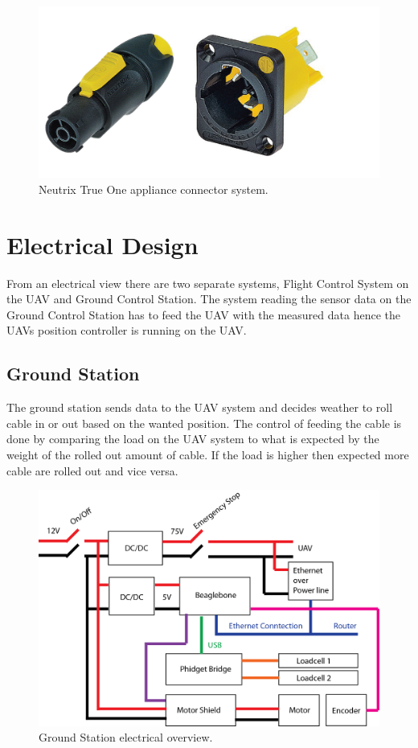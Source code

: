 \begin{figure}[hbtp]
\centering
\includegraphics[scale=1]{graphics/Neutrix-True-One.png}
\caption{Neutrix True One appliance connector system.}
\end{figure}



\section{Electrical Design}
From an electrical view there are two separate systems, Flight Control System on the UAV and Ground Control Station. The system reading the sensor data on the Ground Control Station has to feed the UAV with the measured data hence the UAVs position controller is running on the UAV. 

\subsection{Ground Station}
The ground station sends data to the UAV system and decides weather to roll cable in or out based on the wanted position. The control of feeding the cable is done by comparing the load on the UAV system to what is expected by the weight of the rolled out amount of cable. If the load is higher then expected more cable are rolled out and vice versa.  
\begin{figure}[hbtp]
\centering
\includegraphics[scale=0.75]{graphics/GCS-eltectrical-overview.png}
\caption{Ground Station electrical overview.}
\end{figure}


